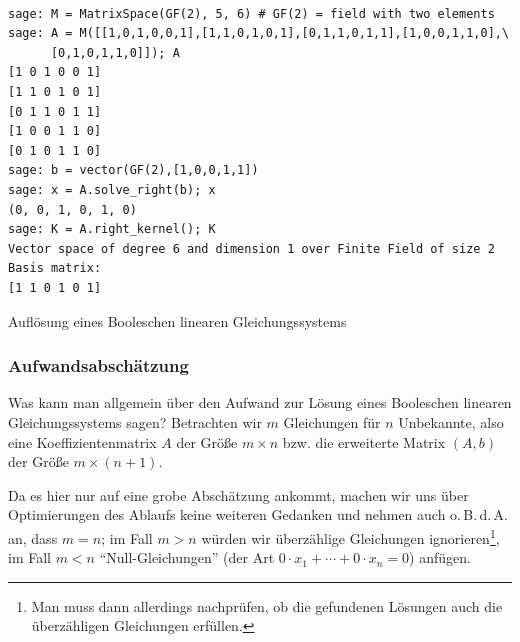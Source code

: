 \begin{refsegment}
\begin{sagecode}
\begin{verbatim}

sage: M = MatrixSpace(GF(2), 5, 6) # GF(2) = field with two elements
sage: A = M([[1,0,1,0,0,1],[1,1,0,1,0,1],[0,1,1,0,1,1],[1,0,0,1,1,0],\
      [0,1,0,1,1,0]]); A
[1 0 1 0 0 1]
[1 1 0 1 0 1]
[0 1 1 0 1 1]
[1 0 0 1 1 0]
[0 1 0 1 1 0]
sage: b = vector(GF(2),[1,0,0,1,1])
sage: x = A.solve_right(b); x
(0, 0, 1, 0, 1, 0)
sage: K = A.right_kernel(); K
Vector space of degree 6 and dimension 1 over Finite Field of size 2
Basis matrix:
[1 1 0 1 0 1]
\end{verbatim}
\caption{Auflösung eines Booleschen linearen Gleichungssystems}
\label{Sage-code-bool-lin-equ}
\end{sagecode}

\subsubsection*{Aufwandsabschätzung}

Was kann man allgemein über den Aufwand zur Lösung eines Booleschen
linearen Gleichungssystems sagen? Betrachten wir $m$ Gleichungen
für $n$ Unbekannte, also eine Koeffizientenmatrix $A$ der Größe
$m \times n$ bzw. die erweiterte Matrix $(A,b)$ der Größe $m \times (n+1)$.

Da es hier nur auf eine grobe Abschätzung ankommt, machen wir uns
über Optimierungen des Ablaufs keine weiteren Gedanken und nehmen
auch o.\,B.\,d.\,A. an, dass $m = n$; im Fall $m > n$ würden wir
überzählige Gleichungen ignorieren\footnote{%
  Man muss dann allerdings nachprüfen, ob die gefundenen Lösungen
  auch die überzähligen Gleichungen erfüllen.
}, im Fall $m < n$ "`Null-Gleichungen"'
(der Art $0\cdot x_1 + \cdots + 0\cdot x_n = 0$) anfügen.


\end{refsegment}
